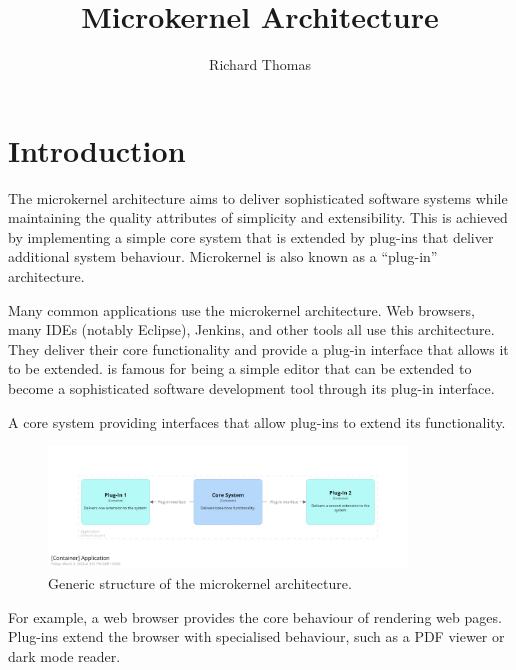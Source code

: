 \title{Microkernel Architecture}
\author{Richard Thomas}
\date{}

\maketitle

\section{Introduction}

The microkernel architecture aims to deliver sophisticated software systems while maintaining the quality attributes of simplicity and extensibility.
This is achieved by implementing a simple core system that is extended by plug-ins that deliver additional system behaviour.
Microkernel is also known as a ``plug-in'' architecture.

Many common applications use the microkernel architecture.
Web browsers, many IDEs (notably Eclipse), Jenkins, and other tools all use this architecture.
They deliver their core functionality and provide a plug-in interface that allows it to be extended.
 is famous for being a simple editor that
can be extended to become a sophisticated software development tool through its plug-in interface.

\vspace{2mm}
\begin{definition}
    A core system providing interfaces that allow plug-ins to extend its functionality.
\end{definition}

\begin{figure}[h!]
    \centering
    \includegraphics[trim=195 195 195 195,clip,width=0.85\textwidth]{diagrams/generic-microkernel.png}
    \caption{Generic structure of the microkernel architecture.}
    \label{fig:microkernel}
\end{figure}

For example, a web browser provides the core behaviour of rendering web pages.
Plug-ins extend the browser with specialised behaviour, such as a PDF viewer or dark mode reader.


